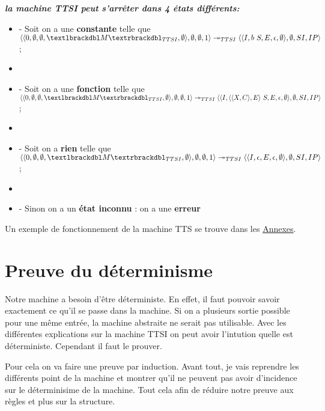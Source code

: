 \documentclass[10pt,a4paper]{report}
\begin{document}
	
\textbf{\textit{la machine TTSI peut s'arrêter dans 4 états différents:}}
\smallbreak
\begin{itemize}
	\item[] - Soit on a une \textbf{constante} telle que 
	$\langle\langle 0,\emptyset,\emptyset,\textlbrackdbl M\textrbrackdbl_{TTSI},\emptyset\rangle,\emptyset,\emptyset,1\rangle 
	\twoheadrightarrow_{TTSI} 
	\langle\langle I,b~S,E,\epsilon,\emptyset\rangle,\emptyset,SI,IP\rangle$;
	\item[] 
	\item[] - Soit on a une \textbf{fonction} telle que
	$\langle\langle 0,\emptyset,\emptyset,\textlbrackdbl M\textrbrackdbl_{TTSI},\emptyset\rangle,\emptyset,\emptyset,1\rangle 
	\twoheadrightarrow_{TTSI} 
	\langle\langle I,\langle\langle X,C\rangle,E\rangle~S,E,\epsilon,\emptyset\rangle,\emptyset,SI,IP\rangle$;
	\item[] 
	\item[] - Soit on a \textbf{rien} telle que  
	$\langle\langle 0,\emptyset,\emptyset,\textlbrackdbl M\textrbrackdbl_{TTSI},\emptyset\rangle,\emptyset,\emptyset,1\rangle 
	\twoheadrightarrow_{TTSI} 
	\langle\langle I,\epsilon,E,\epsilon,\emptyset\rangle,\emptyset,SI,IP\rangle$;
	\item[]
	\item[] - Sinon on a un \textbf{état inconnu} : on a une \textbf{erreur} 
\end{itemize}
\bigbreak


 Un exemple de fonctionnement de la machine TTS se trouve dans les \hyperref[TTSI]{Annexes}.
\newpage
	
	\section{Preuve du déterminisme}
	
	Notre machine a besoin d'être déterministe. En effet, il faut pouvoir savoir exactement ce qu'il se passe dans la machine. Si on a plusieurs sortie possible pour une même entrée, la machine abstraite ne serait pas utilisable. Avec les différentes explications sur la machine TTSI on peut avoir l'intution quelle est déterministe. Cependant il faut le prouver.
	\medbreak
	
	Pour cela on va faire une preuve par induction. Avant tout, je vais reprendre les différents point de la machine et montrer qu'il ne peuvent pas avoir d'incidence sur le déterminisime de la machine. Tout cela afin de réduire notre preuve aux règles et plus sur la structure.
	\bigbreak
	
\end{document}
